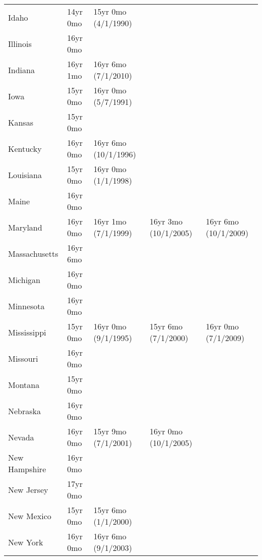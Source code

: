 \documentclass[letterpaper,12pt]{article}
\newcommand\Bstrut{\rule[-3ex]{0pt}{0pt}}   %
\begin{document}
\begin{longtable}{@{\extracolsep{\fill}}lllll@{}}
Idaho & 
14yr 0mo &
15yr 0mo (4/1/1990) \Bstrut\\

Illinois & 
16yr 0mo \Bstrut\\

Indiana & 
16yr 1mo &
16yr 6mo (7/1/2010) \Bstrut\\

Iowa& 
15yr 0mo &
16yr 0mo (5/7/1991) \Bstrut\\

Kansas & 
15yr 0mo \Bstrut\\

Kentucky & 
16yr 0mo &
16yr 6mo (10/1/1996) \Bstrut\\

Louisiana & 
15yr 0mo &
16yr 0mo (1/1/1998) \Bstrut\\

Maine & 
16yr 0mo \Bstrut\\

Maryland & 
16yr 0mo &
16yr 1mo (7/1/1999) &
16yr 3mo (10/1/2005) &
16yr 6mo (10/1/2009) \Bstrut\\

Massachusetts & 
16yr 6mo \Bstrut\\

Michigan & 
16yr 0mo \Bstrut\\

Minnesota & 
16yr 0mo \Bstrut\\

Mississippi & 
15yr 0mo &
16yr 0mo (9/1/1995) &
15yr 6mo (7/1/2000) &
16yr 0mo (7/1/2009) \Bstrut\\

Missouri & 
16yr 0mo \Bstrut\\

Montana & 
15yr 0mo \Bstrut\\

Nebraska & 
16yr 0mo \Bstrut\\

Nevada &
16yr 0mo &
15yr 9mo (7/1/2001) & 
16yr 0mo (10/1/2005) \Bstrut\\

New Hampshire & 
16yr 0mo \Bstrut\\

New Jersey & 
17yr 0mo \Bstrut\\

New Mexico & 
15yr 0mo &
15yr 6mo (1/1/2000) \Bstrut\\

New York & 
16yr 0mo &
16yr 6mo (9/1/2003) \Bstrut\\


\end{longtable}
\end{document}
